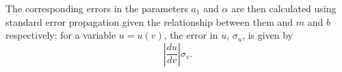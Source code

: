 The corresponding errors in the parameters $a_1$ and $\alpha$ are then calculated using standard error propagation given the relationship between them and $m$ and $b$ respectively; for a variable $u = u(v)$, the error in $u$, $\sigma_u$, is given by
\begin{equation}
\left|\frac{du}{dv}\right|\sigma_v.
\end{equation} 

 

 



 

 
